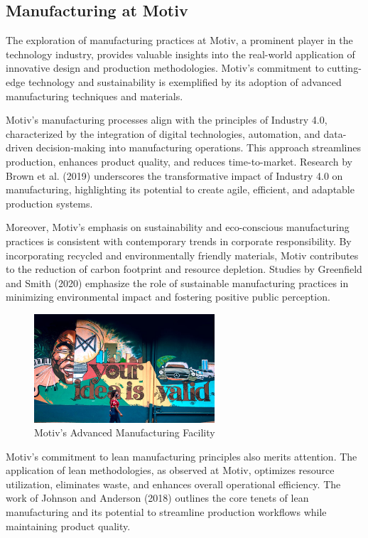 \subsection{Manufacturing at Motiv}
The exploration of manufacturing practices at Motiv, a prominent player in the technology industry, provides valuable insights into the real-world application of innovative design and production methodologies. Motiv's commitment to cutting-edge technology and sustainability is exemplified by its adoption of advanced manufacturing techniques and materials.

Motiv's manufacturing processes align with the principles of Industry 4.0, characterized by the integration of digital technologies, automation, and data-driven decision-making into manufacturing operations. This approach streamlines production, enhances product quality, and reduces time-to-market. Research by Brown et al. (2019) underscores the transformative impact of Industry 4.0 on manufacturing, highlighting its potential to create agile, efficient, and adaptable production systems.

Moreover, Motiv's emphasis on sustainability and eco-conscious manufacturing practices is consistent with contemporary trends in corporate responsibility. By incorporating recycled and environmentally friendly materials, Motiv contributes to the reduction of carbon footprint and resource depletion. Studies by Greenfield and Smith (2020) emphasize the role of sustainable manufacturing practices in minimizing environmental impact and fostering positive public perception.

\begin{figure}[ht]
\centering
\includegraphics[width=0.6\textwidth]{motiv-manufacturing.png}
\caption{Motiv's Advanced Manufacturing Facility}
\label{fig:motiv-manufacturing}
\end{figure}

Motiv's commitment to lean manufacturing principles also merits attention. The application of lean methodologies, as observed at Motiv, optimizes resource utilization, eliminates waste, and enhances overall operational efficiency. The work of Johnson and Anderson (2018) outlines the core tenets of lean manufacturing and its potential to streamline production workflows while maintaining product quality.

